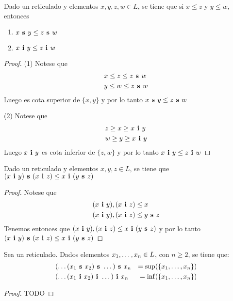 \begin{lemma}
  Dado un reticulado \reticul y elementos $x, y, z, w \in L$, se tiene que
  si $x \leq z$ y $y \leq w$, entonces
  \begin{enumerate}
    \item $x\textbf{ s }y \leq z\textbf{ s }w$
    \item $x\textbf{ i }y \leq z\textbf{ i }w$
  \end{enumerate}
\end{lemma}
\begin{proof}
  (1) Notese que
  \begin{alignat*}{3}
    &x \leq z \leq z\textbf{ s }w\\
    &y \leq w \leq z\textbf{ s }w
  \end{alignat*}
  Luego  es cota superior de $\{x, y\}$ y por lo tanto $x\textbf{ s }y \leq z\textbf{ s }w$

  (2) Notese que
  \begin{alignat*}{3}
    &z \geq x \geq x\textbf{ i }y\\
    &w \geq y \geq x\textbf{ i }y
  \end{alignat*}
  Luego $x\textbf{ i }y$ es cota inferior de $\{z, w\}$ y por lo tanto $x\textbf{ i }y \leq z\textbf{ i }w$
\end{proof}
\begin{lemma}
  Dado un reticulado \reticul y elementos $x, y, z \in L$, se tiene que\\
  $(x\textbf{ i }y)\textbf{ s }(x\textbf{ i }z) \leq x\textbf{ i }(y\textbf{ s }z)$
\end{lemma}
\begin{proof}
  Notese que
  \begin{alignat*}{3}
    &(x\textbf{ i }y), (x\textbf{ i }z) \leq x\\
    &(x\textbf{ i }y), (x\textbf{ i }z) \leq y\textbf{ s }z
  \end{alignat*}
  Tenemos entonces que $(x\textbf{ i }y), (x\textbf{ i }z) \leq x\textbf{ i }(y\textbf{ s }z)$ y por lo tanto $(x\textbf{ i }y)\textbf{ s }(x\textbf{ i }z) \leq x\textbf{ i }(y\textbf{ s }z)$
\end{proof}
\begin{lemma}
  Sea \reticul un reticulado. Dados elementos $x_{1}, \dots, x_{n} \in L$, con $n \geq 2$,
  se tiene que:
  \begin{alignat*}{2}
    &(\dots(x_1\textbf{ s }x_2)\textbf{ s }\dots)\textbf{ s }x_n &= \sup({\{x_{1}, \dots, x_{n}}\})\\
    &(\dots(x_1\textbf{ i }x_2)\textbf{ i }\dots)\textbf{ i }x_n &= \inf({\{x_{1}, \dots, x_{n}}\})        
  \end{alignat*}
\end{lemma}
\begin{proof}
  TODO
\end{proof}
